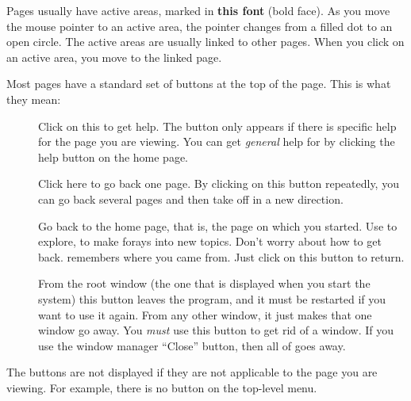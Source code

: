 Pages usually have active areas, marked in
{\bf this font} (bold face).
As you move the mouse pointer to an active area, the pointer changes from
a filled dot to an open circle.
The active areas are usually linked to other pages.
When you click on an active area, you move to the linked page.



%
Most pages have a standard set of buttons at the top of the page.
This is what they mean:

\begin{description}
\item[\StdHelpButton{}] Click on this to get help.
The button only appears if there is specific help for the page you are
viewing.
You can get {\it general} help for \HyperName{} by clicking the help
button on the home page.

\item[\UpButton{}] Click here to go back one page.
By clicking on this button repeatedly, you can go back several pages and
then take off in a new direction.

\item[\ReturnButton{}] Go back to the home page, that is,
the page on which you started.
Use \HyperName{} to explore, to make forays into new topics.
Don't worry about how to get back.
\HyperName{} remembers where you came from.
Just click on this button to return.

\item[\StdExitButton{}] From the root window (the one that is displayed when
you start the system) this button leaves the \HyperName{} program, and it
must be restarted if you want to use it again.
From any other \HyperName{} window, it just makes that one window go away.
You {\it must} use this button to get rid of a window.
If you use the window manager ``Close'' button, then all of \HyperName{}
goes away.
\end{description}
%
The buttons are not displayed if they are not applicable to the page
you are viewing.
For example, there is no \ReturnButton{} button on the top-level menu.


